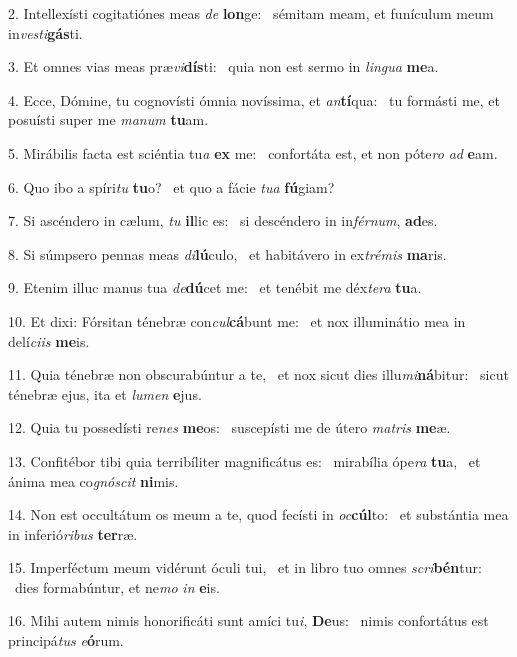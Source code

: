 2. Intellexísti cogitatiónes meas \textit{de} \textbf{lon}ge: \ast\  sémitam meam, et funículum meum in\textit{ves}\textit{ti}\textbf{gás}ti.\

3. Et omnes vias meas præ\textit{vi}\textbf{dís}ti: \ast\  quia non est sermo in \textit{lin}\textit{gua} \textbf{me}a.\

4. Ecce, Dómine, tu cognovísti ómnia novíssima, et \textit{an}\textbf{tí}qua: \ast\  tu formásti me, et posuísti super me \textit{ma}\textit{num} \textbf{tu}am.\

5. Mirábilis facta est sciéntia tu\textit{a} \textbf{ex} me: \ast\  confortáta est, et non póte\textit{ro} \textit{ad} \textbf{e}am.\

6. Quo ibo a spíri\textit{tu} \textbf{tu}o? \ast\  et quo a fácie \textit{tu}\textit{a} \textbf{fú}giam?\

7. Si ascéndero in cælum, \textit{tu} \textbf{il}lic es: \ast\  si descéndero in in\textit{fér}\textit{num}, \textbf{ad}es.\

8. Si súmpsero pennas meas \textit{di}\textbf{lú}culo, \ast\  et habitávero in ex\textit{tré}\textit{mis} \textbf{ma}ris.\

9. Etenim illuc manus tua \textit{de}\textbf{dú}cet me: \ast\  et tenébit me déx\textit{te}\textit{ra} \textbf{tu}a.\

10. Et dixi: Fórsitan ténebræ con\textit{cul}\textbf{cá}bunt me: \ast\  et nox illuminátio mea in delí\textit{ci}\textit{is} \textbf{me}is.\

11. Quia ténebræ non obscurabúntur a te, \dag\  et nox sicut dies illu\textit{mi}\textbf{ná}bitur: \ast\  sicut ténebræ ejus, ita et \textit{lu}\textit{men} \textbf{e}jus.\

12. Quia tu possedísti re\textit{nes} \textbf{me}os: \ast\  suscepísti me de útero \textit{ma}\textit{tris} \textbf{me}æ.\

13. Confitébor tibi quia terribíliter magnificátus es: \dag\  mirabília ópe\textit{ra} \textbf{tu}a, \ast\  et ánima mea co\textit{gnó}\textit{scit} \textbf{ni}mis.\

14. Non est occultátum os meum a te, quod fecísti in \textit{oc}\textbf{cúl}to: \ast\  et substántia mea in inferió\textit{ri}\textit{bus} \textbf{ter}ræ.\

15. Imperféctum meum vidérunt óculi tui, \dag\  et in libro tuo omnes \textit{scri}\textbf{bén}tur: \ast\  dies formabúntur, et ne\textit{mo} \textit{in} \textbf{e}is.\

16. Mihi autem nimis honorificáti sunt amíci tu\textit{i}, \textbf{De}us: \ast\  nimis confortátus est principá\textit{tus} \textit{e}\textbf{ó}rum.\

